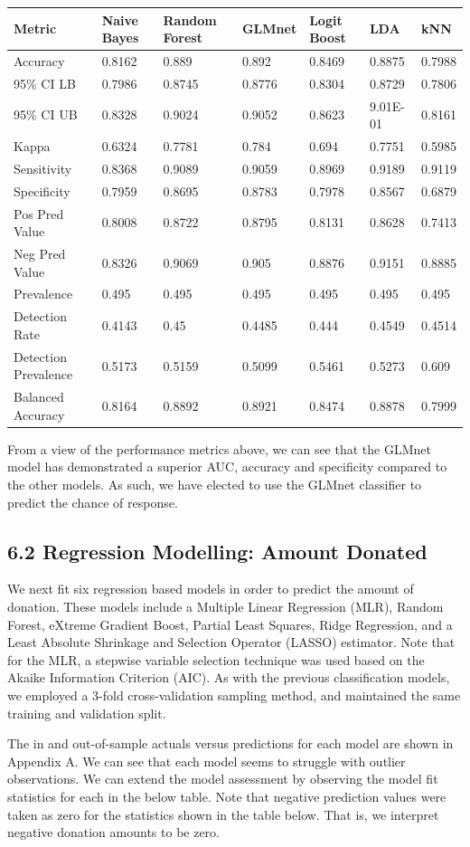 \documentclass[]{article}
\begin{document}
\begin{longtable}[]{@{}lllllll@{}}
\toprule
Metric & Naive Bayes & Random Forest & GLMnet & Logit Boost & LDA &
kNN\tabularnewline
\midrule
\endhead
Accuracy & 0.8162 & 0.889 & 0.892 & 0.8469 & 0.8875 &
0.7988\tabularnewline
95\% CI LB & 0.7986 & 0.8745 & 0.8776 & 0.8304 & 0.8729 &
0.7806\tabularnewline
95\% CI UB & 0.8328 & 0.9024 & 0.9052 & 0.8623 & 9.01E-01 &
0.8161\tabularnewline
Kappa & 0.6324 & 0.7781 & 0.784 & 0.694 & 0.7751 & 0.5985\tabularnewline
Sensitivity & 0.8368 & 0.9089 & 0.9059 & 0.8969 & 0.9189 &
0.9119\tabularnewline
Specificity & 0.7959 & 0.8695 & 0.8783 & 0.7978 & 0.8567 &
0.6879\tabularnewline
Pos Pred Value & 0.8008 & 0.8722 & 0.8795 & 0.8131 & 0.8628 &
0.7413\tabularnewline
Neg Pred Value & 0.8326 & 0.9069 & 0.905 & 0.8876 & 0.9151 &
0.8885\tabularnewline
Prevalence & 0.495 & 0.495 & 0.495 & 0.495 & 0.495 &
0.495\tabularnewline
Detection Rate & 0.4143 & 0.45 & 0.4485 & 0.444 & 0.4549 &
0.4514\tabularnewline
Detection Prevalence & 0.5173 & 0.5159 & 0.5099 & 0.5461 & 0.5273 &
0.609\tabularnewline
Balanced Accuracy & 0.8164 & 0.8892 & 0.8921 & 0.8474 & 0.8878 &
0.7999\tabularnewline
\bottomrule
\end{longtable}

From a view of the performance metrics above, we can see that the GLMnet
model has demonstrated a superior AUC, accuracy and specificity compared
to the other models. As such, we have elected to use the GLMnet
classifier to predict the chance of response.

\subsection{6.2 Regression Modelling: Amount
Donated}\label{regression-modelling-amount-donated}

We next fit six regression based models in order to predict the amount
of donation. These models include a Multiple Linear Regression (MLR),
Random Forest, eXtreme Gradient Boost, Partial Least Squares, Ridge
Regression, and a Least Absolute Shrinkage and Selection Operator
(LASSO) estimator. Note that for the MLR, a stepwise variable selection
technique was used based on the Akaike Information Criterion (AIC). As
with the previous classification models, we employed a 3-fold
cross-validation sampling method, and maintained the same training and
validation split.

The in and out-of-sample actuals versus predictions for each model are
shown in Appendix A. We can see that each model seems to struggle with
outlier observations. We can extend the model assessment by observing
the model fit statistics for each in the below table. Note that negative
prediction values were taken as zero for the statistics shown in the
table below. That is, we interpret negative donation amounts to be zero.
\end{document}
